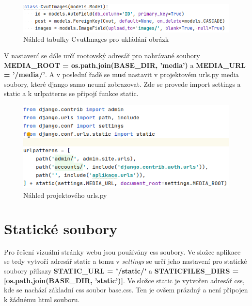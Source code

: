 \begin{figure}[H] \centering
    \includegraphics[width=430pt]{./pictures/9-db-cvutimages.PNG}
    \caption[Náhled tabulky CvutImages pro ukládání obrázků]{Náhled tabulky CvutImages pro ukládání obrázk}
	\label{fig:Náhled tabulky CvutImages pro ukládání obrázk}              
\end{figure}

V nastavení se dále určí rootovský adresář pro nahrávané soubory \textbf{MEDIA\_ROOT = os.path.join(BASE\_DIR, 'media')} a \textbf{MEDIA\_URL = '/media/'}.
A v poslední řadě se musí nastavit v projektovém urls.py media soubory, které django samo neumí zobrazovat. Zde se provede import settings a static a k urlpatterns se připojí funkce static. 

\begin{figure}[H] \centering
    \includegraphics[width=380pt]{./pictures/10-media-urlspy.PNG}
    \caption[Náhled projektového urls.py]{Náhled projektového urls.py}
	\label{fig:Náhled projektového urls.py}              
\end{figure}

\newpage

\section{Statické soubory}

Pro řešení vizuální stránky webu jsou používány css soubory. Ve složce aplikace se tedy vytvoří adresář static a tomu v \emph{settings} se určí jeho nastavení pro statické soubory příkazy \textbf{STATIC\_URL = '/static/'} a \textbf{STATICFILES\_DIRS = [os.path.join(BASE\_DIR, 'static')]}. Ve složce static je vytvořen adresář css, kde se nachází základní css soubor base.css. Ten je ovšem prázdný a není připojen k žádnému html souboru.

